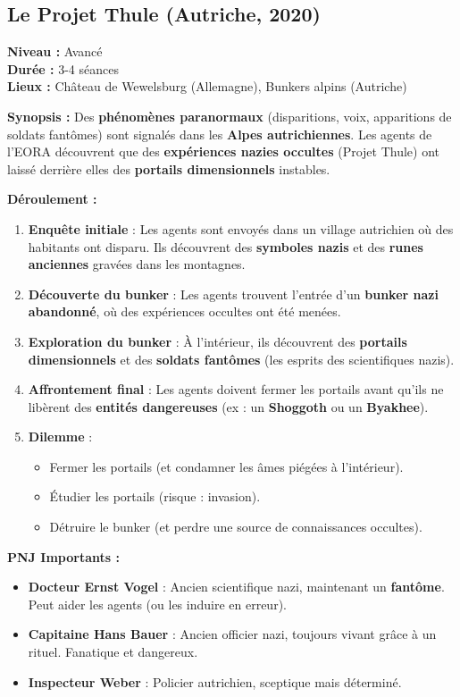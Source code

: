 \documentclass[10pt,a5paper,twoside]{book}
\begin{document}
\subsection{Le Projet Thule (Autriche, 2020)}
\begin{shaded}
\textbf{Niveau :} Avancé \\ \textbf{Durée :} 3-4 séances \\ \textbf{Lieux :} Château de Wewelsburg (Allemagne), Bunkers alpins (Autriche)

\textbf{Synopsis :}
Des \textbf{phénomènes paranormaux} (disparitions, voix, apparitions de soldats fantômes) sont signalés dans les \textbf{Alpes autrichiennes}. Les agents de l'EORA découvrent que des \textbf{expériences nazies occultes} (Projet Thule) ont laissé derrière elles des \textbf{portails dimensionnels} instables.

\textbf{Déroulement :}
	\begin{enumerate}
	\item \textbf{Enquête initiale} : Les agents sont envoyés dans un village autrichien où des habitants ont disparu. Ils découvrent des \textbf{symboles nazis} et des \textbf{runes anciennes} gravées dans les montagnes.
	\item \textbf{Découverte du bunker} : Les agents trouvent l'entrée d'un \textbf{bunker nazi abandonné}, où des expériences occultes ont été menées.
	\item \textbf{Exploration du bunker} : À l'intérieur, ils découvrent des \textbf{portails dimensionnels} et des \textbf{soldats fantômes} (les esprits des scientifiques nazis).
	\item \textbf{Affrontement final} : Les agents doivent fermer les portails avant qu'ils ne libèrent des \textbf{entités dangereuses} (ex : un \textbf{Shoggoth} ou un \textbf{Byakhee}).
	\item \textbf{Dilemme} :
	\begin{itemize}
		\item Fermer les portails (et condamner les âmes piégées à l'intérieur).
		\item Étudier les portails (risque : invasion).
		\item Détruire le bunker (et perdre une source de connaissances occultes).
	\end{itemize}
	\end{enumerate}

\textbf{PNJ Importants :}
	\begin{itemize}
		\item \textbf{Docteur Ernst Vogel} : Ancien scientifique nazi, maintenant un \textbf{fantôme}. Peut aider les agents (ou les induire en erreur).
		\item \textbf{Capitaine Hans Bauer} : Ancien officier nazi, toujours vivant grâce à un rituel. Fanatique et dangereux.
		\item \textbf{Inspecteur Weber} : Policier autrichien, sceptique mais déterminé.
	\end{itemize}


\end{shaded}
\end{document}
